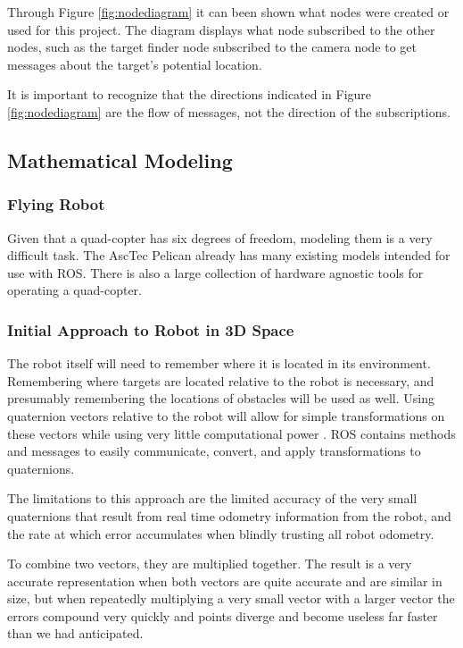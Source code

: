 \documentclass{article}[12]
\begin{document}
	Through Figure \ref{fig:nodediagram} it can been shown what nodes were created or used for this project. The diagram displays what node subscribed to the other nodes, such as the target finder node subscribed to the camera node to get messages about the target's potential location. 
	
 	It is important to recognize that the directions indicated in Figure \ref{fig:nodediagram} are the flow of messages, not the direction of the subscriptions. 

	\subsection{Mathematical Modeling}
	
		\subsubsection{Flying Robot}
	
		Given that a quad-copter has six degrees of freedom, modeling them is a very difficult task. The AscTec Pelican already has many existing models intended for use with ROS. There is also a large collection of hardware agnostic tools for operating a quad-copter.
	
		\subsubsection{Initial Approach to Robot in 3D Space}
		
		The robot itself will need to remember where it is located in its environment. Remembering where targets are located relative to the robot is necessary, and presumably remembering the locations of obstacles will be used as well. Using quaternion vectors relative to the robot will allow for simple transformations on these vectors while using very little computational power \cite{williams2010combining}. ROS contains methods and messages to easily communicate, convert, and apply transformations to quaternions.
		
		The limitations to this approach are the limited accuracy of the very small quaternions that result from real time odometry information from the robot, and the rate at which error accumulates when blindly trusting all robot odometry. 
		
		To combine two vectors, they are multiplied together. The result is a very accurate representation when both vectors are quite accurate and are similar in size, but when repeatedly multiplying a very small vector with a larger vector the errors compound very quickly and points diverge and become useless far faster than we had anticipated.
	
\end{document}
